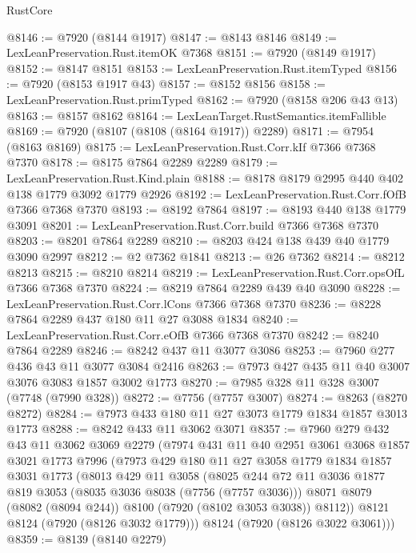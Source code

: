 \begin{lexlean}{RustCore}
\begin{coremodule}
@8146 := @7920 (@8144 @1917)
@8147 := @8143 @8146
@8149 := LexLeanPreservation.Rust.itemOK @7368
@8151 := @7920 (@8149 @1917)
@8152 := @8147 @8151
@8153 := LexLeanPreservation.Rust.itemTyped
@8156 := @7920 (@8153 @1917 @43)
@8157 := @8152 @8156
@8158 := LexLeanPreservation.Rust.primTyped
@8162 := @7920 (@8158 @206 @43 @13)
@8163 := @8157 @8162
@8164 := LexLeanTarget.RustSemantics.itemFallible
@8169 := @7920 (@8107 (@8108 (@8164 @1917)) @2289)
@8171 := @7954 (@8163 @8169)
@8175 := LexLeanPreservation.Rust.Corr.kIf @7366 @7368 @7370
@8178 := @8175 @7864 @2289 @2289
@8179 := LexLeanPreservation.Rust.Kind.plain
@8188 := @8178 @8179 @2995 @440 @402 @138 @1779 @3092 @1779 @2926
@8192 := LexLeanPreservation.Rust.Corr.fOfB @7366 @7368 @7370
@8193 := @8192 @7864
@8197 := @8193 @440 @138 @1779 @3091
@8201 := LexLeanPreservation.Rust.Corr.build @7366 @7368 @7370
@8203 := @8201 @7864 @2289
@8210 := @8203 @424 @138 @439 @40 @1779 @3090 @2997
@8212 := @2 @7362 @1841
@8213 := @26 @7362
@8214 := @8212 @8213
@8215 := @8210 @8214
@8219 := LexLeanPreservation.Rust.Corr.opsOfL @7366 @7368 @7370
@8224 := @8219 @7864 @2289 @439 @40 @3090
@8228 := LexLeanPreservation.Rust.Corr.lCons @7366 @7368 @7370
@8236 := @8228 @7864 @2289 @437 @180 @11 @27 @3088 @1834
@8240 := LexLeanPreservation.Rust.Corr.eOfB @7366 @7368 @7370
@8242 := @8240 @7864 @2289
@8246 := @8242 @437 @11 @3077 @3086
@8253 := @7960 @277 @436 @43 @11 @3077 @3084 @2416
@8263 := @7973 @427 @435 @11 @40 @3007 @3076 @3083 @1857 @3002 @1773
@8270 := @7985 @328 @11 @328 @3007 (@7748 (@7990 @328))
@8272 := @7756 (@7757 @3007)
@8274 := @8263 (@8270 @8272)
@8284 := @7973 @433 @180 @11 @27 @3073 @1779 @1834 @1857 @3013 @1773
@8288 := @8242 @433 @11 @3062 @3071
@8357 := @7960
    @279
    @432
    @43
    @11
    @3062
    @3069
    @2279
    (@7974
      @431
      @11
      @40
      @2951
      @3061
      @3068
      @1857
      @3021
      @1773
      @7996
      (@7973
        @429
        @180
        @11
        @27
        @3058
        @1779
        @1834
        @1857
        @3031
        @1773
        (@8013
          @429
          @11
          @3058
          (@8025
            @244
            @72
            @11
            @3036
            @1877
            @819
            @3053
            (@8035 @3036 @8038 (@7756 (@7757 @3036)))
            @8071
            @8079
            (@8082 (@8094 @244))
            @8100
            (@7920 (@8102 @3053 @3038))
            @8112))
        @8121
        @8124
        (@7920 (@8126 @3032 @1779)))
      @8124
      (@7920 (@8126 @3022 @3061)))
@8359 := @8139 (@8140 @2279)

\end{coremodule}
\end{lexlean}
